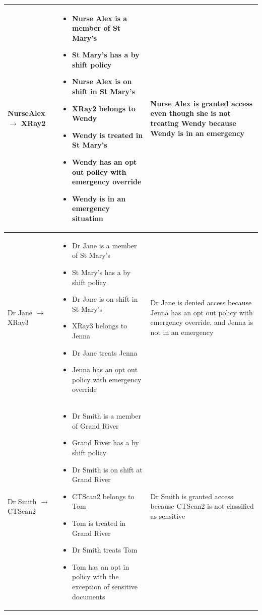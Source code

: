 \documentclass[conference]{IEEEtran}
\begin{document}
\begin{table}[!t]
{\begin{tabular}{m{3cm}|m{9cm}|m{5cm}}
\hline
NurseAlex $\rightarrow$ XRay2 & \begin{itemize}
                               \item Nurse Alex is a member of St Mary's
\item St Mary's has a by shift policy
\item Nurse Alex is on shift in St Mary's
\item XRay2 belongs to Wendy
\item Wendy is treated in St Mary's
\item Wendy has an opt out policy with emergency override
\item Wendy is in an emergency situation
\end{itemize} & Nurse Alex is granted access even though she is not treating Wendy because Wendy is in an emergency\\
\hline
Dr Jane $\rightarrow$ XRay3 & \begin{itemize}
                               \item Dr Jane is a member of St Mary's
\item St Mary's has a by shift policy
\item Dr Jane is on shift in St Mary's
\item XRay3 belongs to Jenna
\item Dr Jane treats Jenna
\item Jenna has an opt out policy with emergency override \end{itemize} & Dr Jane is denied access because Jenna has an opt out policy with emergency override,
and Jenna is not in an emergency\\
\hline
Dr Smith $\rightarrow$ CTScan2 & \begin{itemize}
                                  \item Dr Smith is a member of Grand River
\item Grand River has a by shift policy
\item Dr Smith is on shift at Grand River
\item CTScan2 belongs to Tom
\item Tom is treated in Grand River
\item Dr Smith treats Tom
\item Tom has an opt in policy with the exception of sensitive documents
                                 \end{itemize} & Dr Smith is granted access because CTScan2 is not classified as sensitive\\

\end{tabular}}
\end{table}
\end{document}
